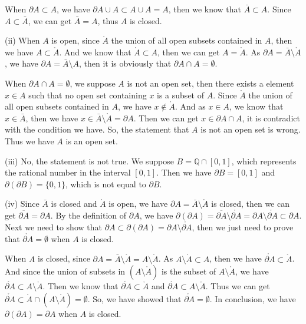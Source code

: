 \documentclass[12pt]{article}
\begin{document}
When $\partial A \subset A$, we have $\partial A \cup A \subset A \cup A = A$, then we know that $\bar{A} \subset A$. Since $A \subset \bar{A}$, we can get $\bar{A} = A$, thus $A$ is closed.

(ii) When $A$ is open, since $\mathring{A}$ the union of all open subsets contained in $A$, then we have $A \subset \mathring {A}$. And we know that $\mathring{A} \subset A$, then we can get $A = \mathring{A}$. As $\partial A = \bar{A} \setminus \mathring{A} $, we have $\partial A = \bar{A} \setminus A $, then it is obviously that $\partial A \cap  A  = \emptyset$.

When $\partial A \cap A = \emptyset$, we suppose $A$ is not an open set, then there exists a element $x \in A$ such that no open set containing $x$ is a subset of $A$. Since $\mathring{A}$ the union of all open subsets contained in $A$, we have $x \notin \mathring{A}$. And as $x \in A$, we know that $x \in \bar{A}$, then we have $x \in \bar{A} \setminus \mathring{A} = \partial A$. Then we can get $x \in  \partial A \cap A $, it is contradict with the condition we have. So, the statement that $A$ is not an open set is wrong. Thus we have $A$ is an open set.

(iii) No, the statement is not true. We suppose $B = \mathbb{Q} \cap [0, 1]$, which represents the rational number in the interval $[0, 1]$. Then we have $\partial B = [0, 1]$ and $\partial (\partial B) = \{0, 1\}$, which is not equal to $\partial B$.

(iv) Since $\bar{A}$ is closed and $\mathring{A}$ is open, we have $\partial A = \bar{A} \setminus \mathring{A} $ is closed, then we can get $\overline{\partial A} = \partial A$. By the definition of $\partial A$, we have $\partial (\partial A) = \overline{\partial A} \setminus \mathring{\partial A} = \partial A \setminus \mathring{\partial A} \subset \partial A$. Next we need to show that $\partial A \subset \partial (\partial A) = \partial A \setminus \mathring{\partial A}$, then we just need to prove that $\mathring{\partial A} = \emptyset$ when $A$ is closed. 

When $A$ is closed, since $\partial A = \bar{A} \setminus \mathring{A} = A \setminus \mathring{A}$. As $A \setminus \mathring{A} \subset A$, then we have $\mathring{\partial A} \subset \mathring{A}$. And since the union of subsets in $(A \setminus \mathring{A})$ is the subset of $ A \setminus \mathring{A}$, we have $\mathring{\partial A} \subset A \setminus \mathring{A}$. Then we know that $\mathring{\partial A} \subset \mathring{A}$ and $\mathring{\partial A} \subset A \setminus \mathring{A}$. Thus we can get $\mathring{\partial A} \subset \mathring{A} \cap (A \setminus \mathring{A}) = \emptyset$. So, we have showed that $\mathring{\partial A} = \emptyset$. In conclusion, we have $\partial(\partial A) = \partial A$ when $A$ is closed.
\end{document}
